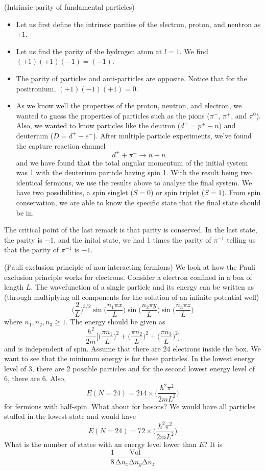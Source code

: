 \begin{rmk}
(Intrinsic parity of fundamental particles) 
\begin{itemize}
\item[(i)] Let us first define the intrinsic parities of the electron, proton, and neutron as $+1$. 
\item[(ii)] Let us find the parity of the hydrogen atom at $l=1$. We find $(+1)(+1)(-1)=(-1)$. 
\item[(iii)] The parity of particles and anti-particles are opposite. Notice that for the positronium, $(+1)(-1)(+1)=0$.
\item[(iv)] As we know well the properties of the proton, neutron, and electron, we wanted to guess the properties of particles such as the pions ($\pi ^{-}$, $\pi ^{+}$, and $\pi ^{0}$). Also, we wanted to know particles like the deutron ($d^{+}=p^{+}-n$) and deuterium ($D=d^{+}-e^{-}$). After multiple particle experiments, we've found the capture reaction channel
\[d^{+}+\pi ^{-}\rightarrow n+n\]
and we have found that the total angular momentum of the initial system was 1 with the deuterium particle having spin 1. With the result being two identical fermions, we use the results above to analyse the final system. We have two possibilities, a spin singlet ($S=0$) or spin triplet ($S=1$). From spin conservation, we are able to know the specific state that the final state should be in.
\end{itemize}
The critical point of the last remark is that parity is conserved. In the last state, the parity is $-1$, and the inital state, we had 1 times the parity of $\pi ^{-1}$ telling us that the parity of $\pi ^{-1}$ is $-1$.
\end{rmk}
\vspace{2ex}
\begin{thm}
(Pauli exclusion principle of non-interacting fermions) We look at how the Pauli exclusion principle works for electrons. Consider a electron confined in a box of length $L$. The wavefunction of a single particle and its energy can be written as (through multiplying all components for the solution of an infinite potential well)
\[\Big(\dfrac{2}{L}\Big)^{3/2}\sin \Big(\dfrac{n_1\pi x}{L}\Big)\sin \Big(\dfrac{n_2\pi y}{L}\Big)\sin \Big(\dfrac{n_3\pi z}{L}\Big)\]
where $n_1,n_2,n_3\geq 1$. The energy should be given as
\[\dfrac{\hbar ^2}{2m}\Big[\Big(\dfrac{\pi n_1}{L}\Big)^2+\Big(\dfrac{\pi n_2}{L}\Big)^2+\Big(\dfrac{\pi n_3}{L}\Big)^2\Big]\]
and is independent of spin. Assume that there are 24 electrons inside the box. We want to see that the minimum energy is for these particles. In the lowest energy level of $3$, there are 2 possible particles and for the second lowest energy level of 6, there are 6. Also,
\[E(N=24)=214\times \Big(\dfrac{\hbar ^2\pi ^2}{2mL^2}\Big)\]
for fermions with half-spin. What about for bosons? We would have all particles stuffed in the lowest state and would have
\[E(N=24)=72\times \Big(\dfrac{\hbar ^2\pi ^2}{2mL^2}\Big)\]
What is the number of states with an energy level lower than $E$? It is
\[\dfrac{1}{8}\dfrac{\mathrm{Vol}}{\mathrm{\Delta }n_{x}\mathrm{\Delta }n_{y}\mathrm{\Delta }n_{z}}\]

\end{thm}
\vspace{2ex}

